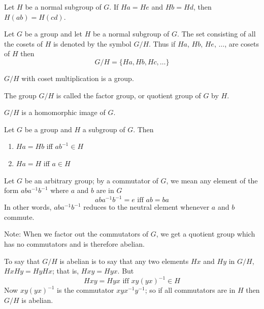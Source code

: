 \documentclass[12pt]{article}
\newcommand{\inverse}[1]{#1 ^{-1}}
\newcommand{\pinverse}[1]{(#1)^{-1}}
\newcommand{\set}[1]{\{ #1 \}}
\begin{document}
\begin{theorem} Let $H$ be a normal subgroup of $G$. If $Ha = He$ and $Hb = Hd$, then $H(ab) = H(cd)$. \end{theorem} 

\begin{definition} Let $G$ be a group and let $H$ be a normal subgroup of $G$. The set consisting of all the cosets of $H$ is denoted by the symbol $G/H$. Thus if $Ha$, $Hb$, $He$, $\dots$, are cosets of $H$ then $$G/H = \set{Ha, Hb, Hc, \dots}$$ \end{definition} 

\begin{theorem} $G/H$ with coset multiplication is a group. \end{theorem} 

\begin{definition} The group $G/H$ is called the factor group, or quotient group of $G$ by $H$. \end{definition} 

\begin{theorem} $G/H$ is a homomorphic image of $G$. \end{theorem} 

\begin{theorem} Let $G$ be a group and $H$ a subgroup of $G$. Then  \begin{enumerate} 
\item $Ha = Hb$ iff $a\inverse{b} \in H$ 
\item $Ha = H$ iff $a \in H$ \end{enumerate} \end{theorem} 

\begin{definition} Let $G$ be an arbitrary group; by a commutator of $G$, we mean any element of the form $ab\inverse{a}\inverse{b}$ where $a$ and $b$ are in $G$ $$ ab\inverse{a}\inverse{b} = e \text{ iff } ab = ba $$ In other words, $ab\inverse{a}\inverse{b}$ reduces to the neutral element whenever $a$ and $b$ commute. \end{definition} 

Note: When we factor out the commutators of $G$, we get a quotient group which has no commutators and is therefore abelian. 

\begin{definition} To say that $G/H$ is abelian is to say that any two elements $Hx$ and $Hy$ in $G/H$, $HxHy = HyHx$; that is, $Hxy = Hyx$. But $$Hxy = Hyx \text{ iff } xy\pinverse{yx} \in H $$ Now $xy\pinverse{yx}$ is the commutator $xy\inverse{x}\inverse{y}$; so if all commutators are in $H$ then $G/H$ is abelian. \end{definition} 
\end{document}
